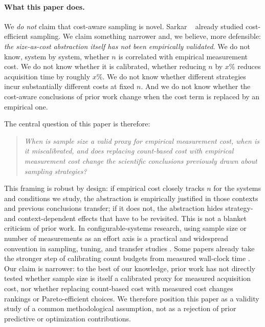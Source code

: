 \paragraph*{What this paper does.}
We \emph{do not} claim that cost-aware sampling is novel. Sarkar
\etal~\cite{sarkar2015} already studied cost-efficient sampling. We claim
something narrower and, we believe, more defensible: \emph{the size-as-cost
abstraction itself has not been empirically validated}. We do not know, system
by system, whether $n$ is correlated with empirical measurement cost. We do not
know whether it is calibrated, \ie whether reducing $n$ by $x\%$ reduces
acquisition time by roughly $x\%$. We do not know whether different strategies
incur substantially different costs at fixed $n$. And we do not know whether
the cost-aware conclusions of prior work change when the cost term is replaced
by an empirical one.

The central question of this paper is therefore:
\begin{quote}
\emph{When is sample size a valid proxy for empirical measurement cost, when is
it miscalibrated, and does replacing count-based cost with empirical
measurement cost change the scientific conclusions previously drawn about
sampling strategies?}
\end{quote}
This framing is robust by design: if empirical cost closely tracks $n$ for the
systems and conditions we study, the abstraction is empirically justified
in those contexts and previous conclusions transfer; if it does not, the
abstraction hides strategy- and context-dependent effects that have to be
revisited.
This is not a blanket criticism of prior work. In configurable-systems
research, using sample size or number of measurements as an effort axis is a
practical and widespread convention in sampling, tuning, and transfer studies
\cite{kaltenecker2019,pereira2020,chen2021multiobj,chen2023aspirations,gong2024sempl}.
Some papers already take the stronger step of calibrating count budgets from
measured wall-clock time \cite{chen2021multiobj,chen2023aspirations}. Our claim
is narrower: to the best of our knowledge, prior work has not directly tested
whether sample size is itself a calibrated proxy for measured acquisition cost,
nor whether replacing count-based cost with measured cost changes rankings or
Pareto-efficient choices. We therefore position this paper as a validity study
of a common methodological assumption, not as a rejection of prior predictive
or optimization contributions.

